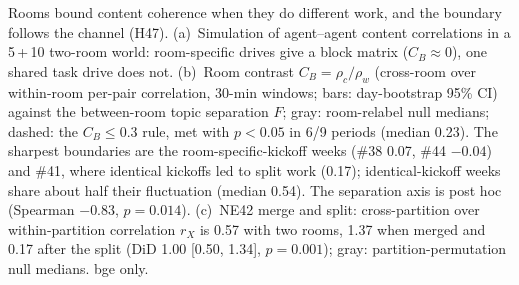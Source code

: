 \caption{Rooms bound content coherence when they do different work, and the boundary follows the channel (H47). (a)~Simulation of agent--agent content correlations in a 5\,+\,10 two-room world: room-specific drives give a block matrix ($C_B\approx0$), one shared task drive does not. (b)~Room contrast $C_B=\rho_c/\rho_w$ (cross-room over within-room per-pair correlation, 30-min windows; bars: day-bootstrap 95\% CI) against the between-room topic separation $F$; gray: room-relabel null medians; dashed: the $C_B\le0.3$ rule, met with $p<0.05$ in 6/9 periods (median 0.23). The sharpest boundaries are the room-specific-kickoff weeks (\#38 0.07, \#44 $-0.04$) and \#41, where identical kickoffs led to split work (0.17); identical-kickoff weeks share about half their fluctuation (median 0.54). The separation axis is post hoc (Spearman $-0.83$, $p=0.014$). (c)~NE42 merge and split: cross-partition over within-partition correlation $r_X$ is 0.57 with two rooms, 1.37 when merged and 0.17 after the split (DiD 1.00 [0.50, 1.34], $p=0.001$); gray: partition-permutation null medians. bge only.}
\label{fig:H47}
